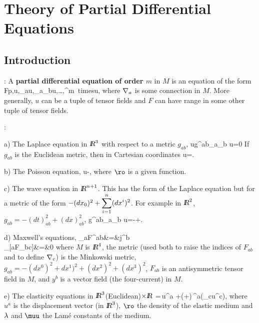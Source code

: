 

\chapter{Theory of Partial Differential Equations}
\label{theory_of_partial_differential_equations}

\section{Introduction}

\noi
{}: 
A {\bf partial differential equation of order $m$} in $M$ is an equation of the form
\beq
F\lp p,u,\na_au,\na_a\na_bu,\ldots,^{m\mbox{
times}}u,
\eeq
where $\nabla_a$ is some connection in $M$.
More generally, $u$ can be a tuple of tensor fields and $F$ can have range in some other tuple of tensor fields.

\espa
\noi
{}:
\espa

\noi
a) The Laplace equation in $\mbox{\sl {l$\!\!\!\;\:\!$R}}^3$ with respect to a metric $g_{ab}$,
\beq
\Del u\equiv g^{ab}\na_a\na_b u=0
\eeq
If $g_{ab}$ is the Euclidean metric, then in Cartesian coordinates
\beq
\Del u=.
\eeq
\espa

\noi
b) The Poisson equation,
\beq
\Del u-,
\eeq
where $\ro$ is a given function.
\espa

\noi
c) The wave equation in $\mbox{\sl {l$\!\!\!\;\:\!$R}}^{n+1}$. This has the form of the Laplace equation but for a metric of the form $-(dx_0)^2+\displaystyle
\sum_{i=1}^n(dx^i)^2$. For example in $\mbox{\sl {l$\!\!\!\;\:\!$R}}^2$, $g_{ab}=-(dt)^2_{ab}
+(dx)^2_{ab}$,
\beq
g^{ab}\na_a\na_b u=-+.
\eeq
\espa

\noi
d) Maxwell's equations,
\beq{}
\na_aF^{ab}&=&j^b\\
\na_{[a}F_{bc]}&=&0
\earr
\eeq
where $M$ is $\mbox{\sl {l$\!\!\!\;\:\!$R}}^4$, the metric (used both to raise the indices of
$F_{ab}$ and to define $\nabla_c$) is the Minkowski metric, $g_{ab}=-(dx^0)^2
+dx^1)^2+(dx^2)^2+(dx^3)^2$, $F_{ab}$ is an antisymmetric tensor field in $M$, and $y^b$ is a vector field (the
four-current) in $M$.
\espa

\noi
e) The elasticity equations in $\mbox{\sl {l$\!\!\!\;\:\!$R}}^3$(Euclidean)$\times\mbox{\sl {l$\!\!\!\;\:\!$R}}$
\beq
\ro{}=\muu\,\Del u^a +(\lam+\muu)\,\na^a(\na_cu^c),
\eeq
where $u^a$ is the displacement vector (in $\mbox{\sl {l$\!\!\!\;\:\!$R}}^3$), $\ro$ the density of the elastic medium and $\mbox{$\lambda$}$ and $\muu$ the Lamé constants of the medium.

